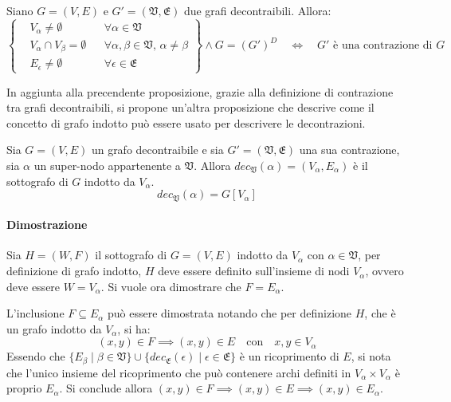 \begin{proposition}
    Siano $G = (V, E)$ e $G' = (\mathfrak{V}, \mathfrak{E})$ due grafi decontraibili. Allora:
    \begin{equation*}
        \left\{
        \begin{aligned}
            &V_\alpha \neq \emptyset  &&\forall \alpha \in \mathfrak{V} \\
            &V_{\alpha} \cap V_{\beta} = \emptyset &&\forall \alpha, \beta \in \mathfrak{V}, \, \alpha \neq \beta \\
            &E_{\epsilon} \neq \emptyset  &&\forall \epsilon \in \mathfrak{E}
        \end{aligned}
        \right\}
        \land G = (G')^D \quad \Longleftrightarrow \quad G' \text{ è una contrazione di } G
    \end{equation*}
\end{proposition}

In aggiunta alla precendente proposizione, grazie alla definizione di contrazione tra grafi decontraibili,
si propone un'altra proposizione che descrive come il concetto di grafo indotto pu\`o essere usato per descrivere
le decontrazioni.

\begin{proposition}
Sia $G=(V, E)$ un grafo decontraibile e sia $G' = (\mathfrak{V}, \mathfrak{E})$ una sua contrazione,
sia $\alpha$ un super-nodo appartenente a $\mathfrak{V}$.
Allora $dec_{\mathfrak{V}}(\alpha) = (V_\alpha, E_\alpha)$ \`e il sottografo di $G$ indotto da $V_\alpha$.
\begin{equation*}
    dec_{\mathfrak{V}}(\alpha) = G[V_\alpha]
\end{equation*}
\end{proposition}

\paragraph{Dimostrazione}
Sia $H = (W, F)$ il sottografo di $G = (V, E)$ indotto da $V_\alpha$ con
$\alpha \in \mathfrak{V}$, per definizione di grafo indotto, $H$ deve essere definito sull'insieme di nodi
$V_\alpha$, ovvero deve essere $W = V_\alpha$.
Si vuole ora dimostrare che $F = E_\alpha$. \newline

L'inclusione $F \subseteq E_\alpha$ pu\`o essere dimostrata notando che per definizione $H$,
che \`e un grafo indotto da $V_\alpha$, si ha:
\begin{equation*}
(x, y) \in F \implies (x, y) \in E \quad \text{con} \quad x, y \in V_{\alpha}
\end{equation*}
Essendo che $\{ E_\beta \mid \beta \in \mathfrak{V}\}
\cup \{ dec_{\mathfrak{E}}(\epsilon) \mid \epsilon \in \mathfrak{E}\}$ \`e un ricoprimento di $E$, si nota che
l'unico insieme del ricoprimento che pu\`o contenere archi definiti in $V_\alpha \times V_\alpha$
\`e proprio $E_\alpha$. Si conclude allora $(x, y) \in F \implies (x, y) \in E \implies (x, y) \in E_\alpha $.
\newline

